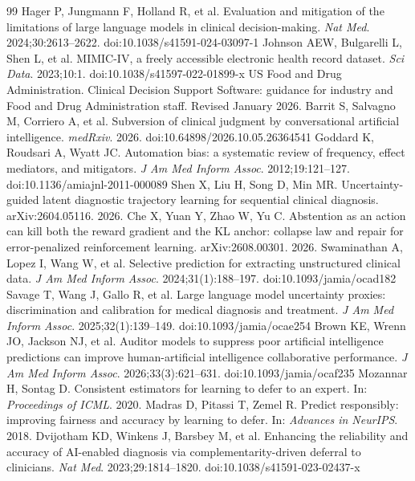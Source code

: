 \documentclass[11pt]{article}
\begin{document}
\begin{thebibliography}{99}
\small
{} Hager P, Jungmann F, Holland R, et al. Evaluation and mitigation of the limitations of large language models in clinical decision-making. \textit{Nat Med}. 2024;30:2613--2622. doi:10.1038/s41591-024-03097-1
 Johnson AEW, Bulgarelli L, Shen L, et al. MIMIC-IV, a freely accessible electronic health record dataset. \textit{Sci Data}. 2023;10:1. doi:10.1038/s41597-022-01899-x
 US Food and Drug Administration. Clinical Decision Support Software: guidance for industry and Food and Drug Administration staff. Revised January 2026.
 Barrit S, Salvagno M, Corriero A, et al. Subversion of clinical judgment by conversational artificial intelligence. \textit{medRxiv}. 2026. doi:10.64898/2026.10.05.26364541
 Goddard K, Roudsari A, Wyatt JC. Automation bias: a systematic review of frequency, effect mediators, and mitigators. \textit{J Am Med Inform Assoc}. 2012;19:121--127. doi:10.1136/amiajnl-2011-000089
 Shen X, Liu H, Song D, Min MR. Uncertainty-guided latent diagnostic trajectory learning for sequential clinical diagnosis. arXiv:2604.05116. 2026.
 Che X, Yuan Y, Zhao W, Yu C. Abstention as an action can kill both the reward gradient and the KL anchor: collapse law and repair for error-penalized reinforcement learning. arXiv:2608.00301. 2026.
 Swaminathan A, Lopez I, Wang W, et al. Selective prediction for extracting unstructured clinical data. \textit{J Am Med Inform Assoc}. 2024;31(1):188--197. doi:10.1093/jamia/ocad182
 Savage T, Wang J, Gallo R, et al. Large language model uncertainty proxies: discrimination and calibration for medical diagnosis and treatment. \textit{J Am Med Inform Assoc}. 2025;32(1):139--149. doi:10.1093/jamia/ocae254
 Brown KE, Wrenn JO, Jackson NJ, et al. Auditor models to suppress poor artificial intelligence predictions can improve human-artificial intelligence collaborative performance. \textit{J Am Med Inform Assoc}. 2026;33(3):621--631. doi:10.1093/jamia/ocaf235
 Mozannar H, Sontag D. Consistent estimators for learning to defer to an expert. In: \textit{Proceedings of ICML}. 2020.
 Madras D, Pitassi T, Zemel R. Predict responsibly: improving fairness and accuracy by learning to defer. In: \textit{Advances in NeurIPS}. 2018.
 Dvijotham KD, Winkens J, Barsbey M, et al. Enhancing the reliability and accuracy of AI-enabled diagnosis via complementarity-driven deferral to clinicians. \textit{Nat Med}. 2023;29:1814--1820. doi:10.1038/s41591-023-02437-x

\end{thebibliography}
\end{document}
